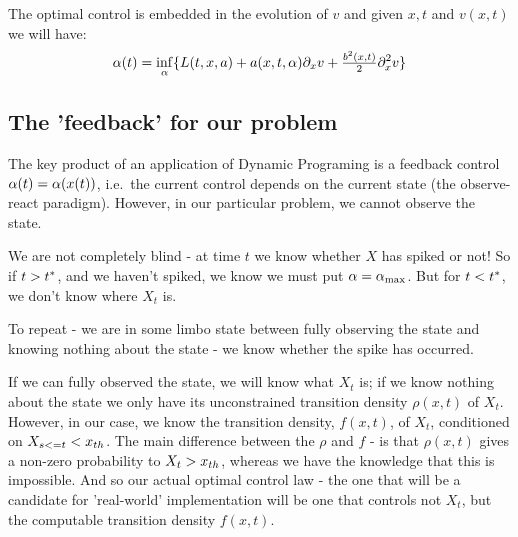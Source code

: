 \documentclass{article}
\begin{document}
The optimal control is embedded in the evolution of $v$ and given $x,t$
and $v(x,t)$ we will have: 
\begin{equation}
{\alpha}(t) = \inf_{{\alpha}}  \{ L(t,x,a)  + a(x,t,{\alpha}){\partial}_x v + \tfrac{b^2(x,t)}{2}
{\partial}^2_x v \}
\end{equation}

\subsection{The 'feedback' for our problem}
The key product of an application of Dynamic Programing is a feedback control
${\alpha}(t) = {\alpha}(x(t))$, i.e.\ the current control depends on the current state (the
observe-react paradigm). However, in our particular problem, we cannot observe
the state.

We are not completely blind - at time $t$ we know whether $X$ has spiked
or not! So if $t > { t^* }$, and we haven't spiked, we know we must put ${\alpha} =
{ {\alpha}_{\textrm{max}} }$. But for $t < { t^* }$, we don't know where $X_t$ is. 

To repeat - we are in some limbo state between fully observing the state and
knowing nothing about the state - we know whether the spike has occurred. 

If we can fully observed the state, we will know what $X_t$ is; if we know
nothing about the state we only have its unconstrained transition density
$\rho(x,t)$ of $X_t$. However, in our case, we know the transition density,
$f(x,t)$, of $X_t$, conditioned on $X_{s <=t} < { x_{th} }$. The main difference
between the $\rho$ and $f$ - is that $\rho(x,t)$ gives a non-zero probability to
$X_t > { x_{th} }$, whereas we have the knowledge that this is impossible. And so
our actual optimal control law - the one that will be a candidate for
'real-world' implementation will be one that controls not $X_t$, but the
computable transition density $f(x,t)$. 

% 
\end{document}
